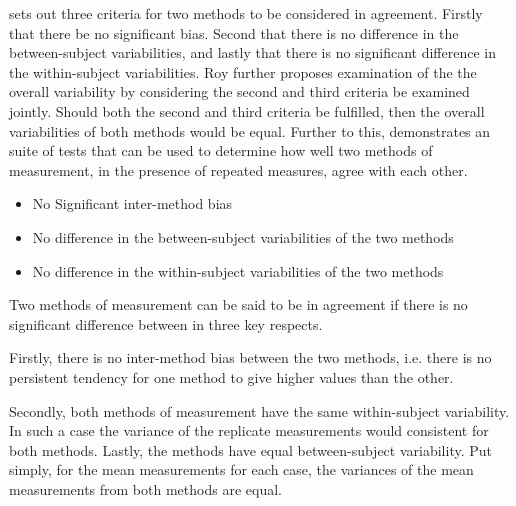 \documentclass[12pt, a4paper]{report}
\theoremstyle{plain}
\theoremstyle{definition}
\theoremstyle{remark}
\begin{document}
%
%
\citet{ARoy2009} sets out three criteria for two methods to be considered in agreement. Firstly that there be no significant bias. Second that there is no difference in the between-subject variabilities, and lastly that there is no significant difference in the within-subject variabilities. Roy further proposes examination of the the overall variability by considering the second and third criteria be examined jointly. Should both the second and third criteria be fulfilled, then the overall variabilities of both methods would be equal.
Further to this, \citet{ARoy2009} demonstrates an suite of tests that can be used to determine how well two methods of measurement, in the presence of repeated measures, agree with each other.

\begin{itemize}\itemsep0.5cm
	\item No Significant inter-method bias
	\item No difference in the between-subject variabilities of the two methods
	\item No difference in the within-subject variabilities of the two methods
\end{itemize}




Two methods of measurement can be said to be in agreement if there is no significant difference between in three key respects. 

Firstly, there is no inter-method bias between the two methods, i.e. there is no persistent tendency for one method to give higher values than the other.

Secondly, both methods of measurement have the same  within-subject variability. In such a case the variance of the replicate measurements would consistent for both methods.
Lastly, the methods have equal between-subject variability.  Put simply, for the mean measurements for each case, the variances of the mean measurements from both methods are equal.
\end{document}
